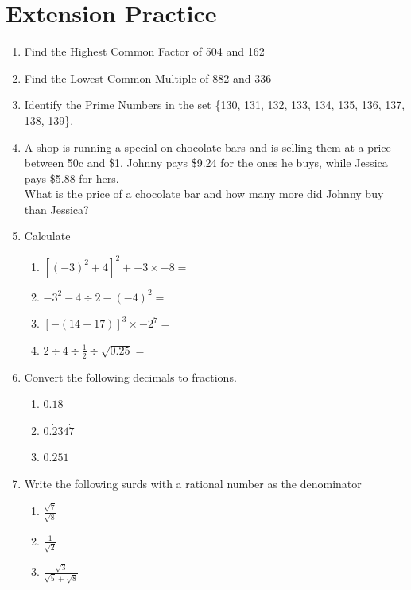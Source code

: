 \documentclass[a4paper,12pt]{article}
\begin{document}
\section{Extension Practice}
\begin{enumerate}
	\item Find the Highest Common Factor of 504 and 162
	\item Find the Lowest Common Multiple of 882 and 336
	\item Identify the Prime Numbers in the set \{130, 131, 132, 133, 134, 135, 136, 137, 138, 139\}.
	\item A shop is running a special on chocolate bars and is selling them at a price between 50c and \$1. Johnny pays \$9.24 for the ones he buys, while Jessica pays \$5.88 for hers.\\
	What is the price of a chocolate bar and how many more did Johnny buy than Jessica?
	\item Calculate
	\begin{enumerate}
		\item $\displaystyle [(-3)^{2}+4]^{2}+-3\times -8=$
		\item $\displaystyle -3^{2}-4\div2-(-4)^{2}=$
		\item $\displaystyle [-(14-17)]^{3}\times -2^{7}=$
		\item $\displaystyle 2\div 4\div \frac{1}{2}\div \sqrt{0.25}=$
	\end{enumerate}
	\item Convert the following decimals to fractions.
	\begin{enumerate}
		\item $\displaystyle 0.1\dot{8}$
		\item $\displaystyle 0.\dot{2}34\dot{7}$
		\item $\displaystyle 0.25\dot{1}$
	\end{enumerate}
	\item Write the following surds with a rational number as the denominator
	\begin{enumerate}
		\item $\displaystyle \frac{\sqrt{7}}{\sqrt{8}}$
		\item $\displaystyle \frac{1}{\sqrt{2}}$
		\item $\displaystyle \frac{\sqrt{3}}{\sqrt{5}+\sqrt{8}}$
	\end{enumerate}
	
	
\end{enumerate}


\newpage
\end{document}

